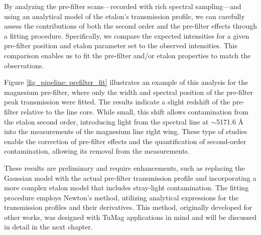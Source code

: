 By analyzing the pre-filter scans—recorded with rich spectral sampling—and using an analytical model of the etalon's transmission profile, we can carefully assess the contributions of both the second order and the pre-filter effects through a fitting procedure. Specifically, we compare the expected intensities for a given pre-filter position and etalon parameter set to the observed intensities. This comparison enables us to fit the pre-filter and/or etalon properties to match the observations.

Figure \ref{fig_pipeline: prefilter_fit} illustrates an example of this analysis for the magnesium pre-filter, where only the width and spectral position of the pre-filter peak transmission were fitted. The results indicate a slight redshift of the pre-filter relative to the line core. While small, this shift allows contamination from the etalon second order, introducing light from the spectral line at $\sim$5171.6 \r{A} into the measurements of the magnesium line right wing. These type of studies enable the correction of pre-filter effects and the quantification of second-order contamination, allowing its removal from the measurements.

These results are preliminary and require enhancements, such as replacing the Gaussian model with the actual pre-filter transmission profile and incorporating a more complex etalon model that includes stray-light contamination. The fitting procedure employs Newton's method, utilizing analytical expressions for the transmission profiles and their derivatives. This method, originally developed for other works, was designed with TuMag applications in mind and will be discussed in detail in the next chapter.
